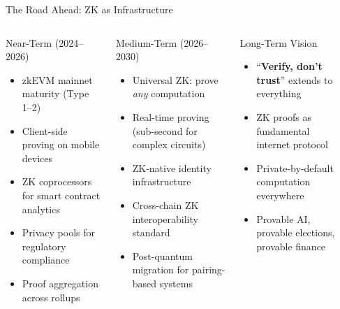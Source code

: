 \documentclass[8pt,aspectratio=169]{beamer}
\begin{document}
\begin{frame}{The Road Ahead: ZK as Infrastructure}
\begin{columns}[T]
\begin{block}{\footnotesize Near-Term (2024--2026)}
\footnotesize
\begin{itemize}
\item zkEVM mainnet maturity (Type 1--2)
\item Client-side proving on mobile devices
\item ZK coprocessors for smart contract analytics
\item Privacy pools for regulatory compliance
\item Proof aggregation across rollups
\end{itemize}
\end{block}
\vspace{0.1cm}
\begin{block}{\footnotesize Medium-Term (2026--2030)}
\footnotesize
\begin{itemize}
\item Universal ZK: prove \emph{any} computation
\item Real-time proving (sub-second for complex circuits)
\item ZK-native identity infrastructure
\item Cross-chain ZK interoperability standard
\item Post-quantum migration for pairing-based systems
\end{itemize}
\end{block}
\begin{block}{\footnotesize Long-Term Vision}
\footnotesize
\begin{itemize}
\item ``\textbf{Verify, don't trust}'' extends to everything
\item ZK proofs as fundamental internet protocol
\item Private-by-default computation everywhere
\item Provable AI, provable elections, provable finance
\end{itemize}
\end{block}
\vspace{0.1cm}
\begin{center}
\begin{tikzpicture}[scale=0.65, every node/.style={font=\tiny},
  bx/.style={rounded corners, draw=mlpurple, minimum width=2.8cm, minimum height=0.6cm, align=center}]

\end{tikzpicture}
\end{center}
\end{columns}
\end{frame}
\end{document}
